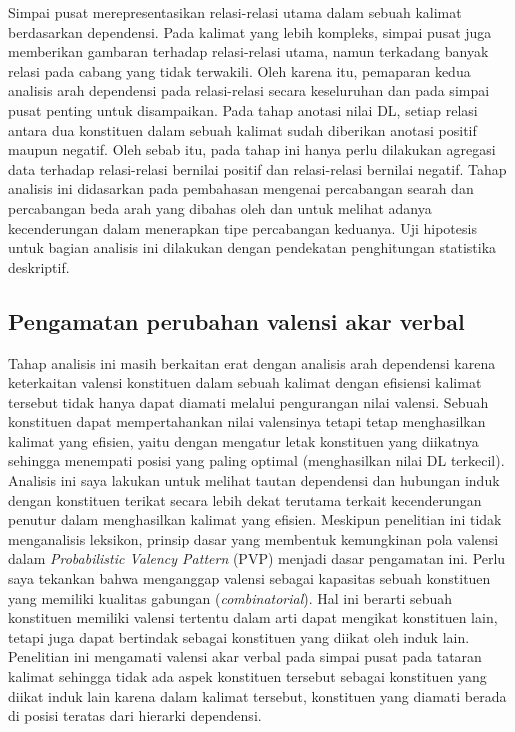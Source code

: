 Simpai pusat merepresentasikan relasi-relasi utama dalam sebuah kalimat berdasarkan dependensi. Pada kalimat yang lebih kompleks, simpai pusat juga memberikan gambaran terhadap relasi-relasi utama, namun terkadang banyak relasi pada cabang yang tidak terwakili. Oleh karena itu, pemaparan kedua analisis arah dependensi pada relasi-relasi secara keseluruhan dan pada simpai pusat penting untuk disampaikan. Pada tahap anotasi nilai DL, setiap relasi antara dua konstituen dalam sebuah kalimat sudah diberikan anotasi positif maupun negatif. Oleh sebab itu, pada tahap ini hanya perlu dilakukan agregasi data terhadap relasi-relasi bernilai positif dan relasi-relasi bernilai negatif. Tahap analisis ini didasarkan pada pembahasan mengenai percabangan searah dan percabangan beda arah yang dibahas oleh \cite{temperley2008dependency} dan \cite{dryer1992greenbergian} untuk melihat adanya kecenderungan dalam menerapkan tipe percabangan keduanya. Uji hipotesis untuk bagian analisis ini dilakukan dengan pendekatan penghitungan statistika deskriptif.

\subsection{Pengamatan perubahan valensi akar verbal}
Tahap analisis ini masih berkaitan erat dengan analisis arah dependensi karena keterkaitan valensi konstituen dalam sebuah kalimat dengan efisiensi kalimat tersebut tidak hanya dapat diamati melalui pengurangan nilai valensi. Sebuah konstituen dapat mempertahankan nilai valensinya tetapi tetap menghasilkan kalimat yang efisien, yaitu dengan mengatur letak konstituen yang diikatnya sehingga menempati posisi yang paling optimal (menghasilkan nilai DL terkecil). Analisis ini saya lakukan untuk melihat tautan dependensi dan hubungan induk dengan konstituen terikat secara lebih dekat terutama terkait kecenderungan penutur dalam menghasilkan kalimat yang efisien. Meskipun penelitian ini tidak menganalisis leksikon, prinsip dasar yang membentuk kemungkinan pola valensi dalam \textit{Probabilistic Valency Pattern} (PVP) \citep{liu2006syntactic} menjadi dasar pengamatan ini. Perlu saya tekankan bahwa \cite{liu2006syntactic} menganggap valensi sebagai kapasitas sebuah konstituen yang memiliki kualitas gabungan (\textit{combinatorial}). Hal ini berarti sebuah konstituen memiliki valensi tertentu dalam arti dapat mengikat konstituen lain, tetapi juga dapat bertindak sebagai konstituen yang diikat oleh induk lain. Penelitian ini mengamati valensi akar verbal pada simpai pusat pada tataran kalimat sehingga tidak ada aspek konstituen tersebut sebagai konstituen yang diikat induk lain karena dalam kalimat tersebut, konstituen yang diamati berada di posisi teratas dari hierarki dependensi.

